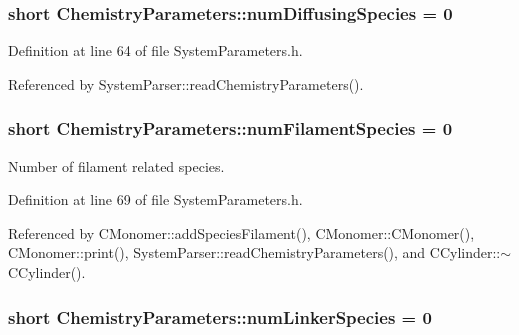 \hypertarget{structChemistryParameters_a78116d90c15faebd400cb5c75ce00e26}{
\subsubsection[{num\+Diffusing\+Species}]{\setlength{\rightskip}{0pt plus 5cm}short Chemistry\+Parameters\+::num\+Diffusing\+Species = 0}}\label{structChemistryParameters_a78116d90c15faebd400cb5c75ce00e26}


Definition at line 64 of file System\+Parameters.\+h.



Referenced by System\+Parser\+::read\+Chemistry\+Parameters().

\hypertarget{structChemistryParameters_aa3ff68ed0be86482f1ea6d40b9d0fa1c}{
\subsubsection[{num\+Filament\+Species}]{\setlength{\rightskip}{0pt plus 5cm}short Chemistry\+Parameters\+::num\+Filament\+Species = 0}}\label{structChemistryParameters_aa3ff68ed0be86482f1ea6d40b9d0fa1c}


Number of filament related species. 



Definition at line 69 of file System\+Parameters.\+h.



Referenced by C\+Monomer\+::add\+Species\+Filament(), C\+Monomer\+::\+C\+Monomer(), C\+Monomer\+::print(), System\+Parser\+::read\+Chemistry\+Parameters(), and C\+Cylinder\+::$\sim$\+C\+Cylinder().

\hypertarget{structChemistryParameters_af82c8c5d13f1e092d9eb69a7e8e3b5a4}{
\subsubsection[{num\+Linker\+Species}]{\setlength{\rightskip}{0pt plus 5cm}short Chemistry\+Parameters\+::num\+Linker\+Species = 0}}\label{structChemistryParameters_af82c8c5d13f1e092d9eb69a7e8e3b5a4}


